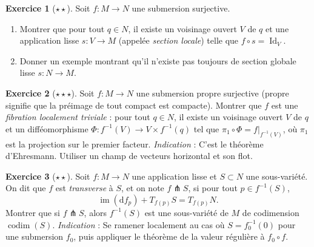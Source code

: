 \documentclass[12pt,a4paper,openany]{book}
\theoremstyle{definition}
\newtheorem{exercice}{Exercice}[chapter]
\theoremstyle{plain}
\theoremstyle{remark}
\DeclareMathOperator{\Id}{Id}
\DeclareMathOperator{\im}{im}
\newcommand{\dd}{\mathrm{d}}
\begin{document}
\begin{exercice}[$\star\star$]\label{exo:submersion-section}
Soit $f \colon M \to N$ une submersion surjective.
\begin{enumerate}[label=(\alph*)]
    \item Montrer que pour tout $q \in N$, il existe un voisinage ouvert $V$ de
    $q$ et une application lisse $s \colon V \to M$ (appelée \emph{section
    locale}) telle que $f \circ s = \Id_V$.
    \item Donner un exemple montrant qu'il n'existe pas toujours de section
    globale lisse $s \colon N \to M$.
\end{enumerate}
\end{exercice}

\begin{exercice}[$\star\star\star$]\label{exo:submersion-propre}
Soit $f \colon M \to N$ une submersion propre surjective (propre signifie que
la préimage de tout compact est compacte). Montrer que $f$ est une
\emph{fibration localement triviale} :
pour tout $q \in N$, il existe un voisinage ouvert $V$ de $q$ et un
difféomorphisme $\Phi \colon f^{-1}(V) \to V \times f^{-1}(q)$ tel que
$\pi_1 \circ \Phi = f|_{f^{-1}(V)}$, où $\pi_1$ est la projection sur le
premier facteur.
\emph{Indication} : C'est le théorème d'Ehresmann.
Utiliser un champ de vecteurs horizontal et son flot.
\end{exercice}

\begin{exercice}[$\star\star$]\label{exo:image-inverse-sous-variete}
Soit $f \colon M \to N$ une application lisse et $S \subset N$ une sous-variété.
On dit que $f$ est \emph{transverse} à $S$, et on note $f \pitchfork S$, si
pour tout $p \in f^{-1}(S)$,
\[
    \im(\dd f_p) + T_{f(p)}S = T_{f(p)}N.
\]
Montrer que si $f \pitchfork S$, alors $f^{-1}(S)$ est une sous-variété de $M$
de codimension $\operatorname{codim}(S)$.
\emph{Indication} : Se ramener localement au cas où $S = f_0^{-1}(0)$ pour une
submersion $f_0$, puis appliquer le théorème de la valeur régulière à
$f_0 \circ f$.
\end{exercice}
\end{document}
